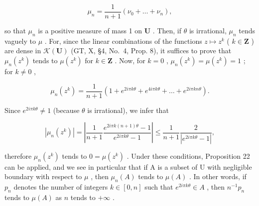 \[
\mu_ {n} = \frac {1}{n + 1} (\nu_ {0} + \dots + \nu_ {n}),
\]

so that \(\mu_n\) is a positive measure of mass 1 on \(\mathbf{U}\) . Then, if \(\theta\) is irrational, \(\mu_n\) tends vaguely to \(\mu\) . For, since the linear combinations of the functions \(z \mapsto z^k\) ( \(k \in \mathbf{Z}\) ) are dense in \(\mathcal{K}(\mathbf{U})\) (GT, X, §4, No.~4, Prop. 8), it suffices to prove that \(\mu_n(z^k)\) tends to \(\mu(z^k)\) for \(k \in \mathbf{Z}\) . Now, for \(k = 0\) , \(\mu_n(z^k) = \mu(z^k) = 1\) ; for \(k \neq 0\) ,

\[
\mu_ {n} (z ^ {k}) = \frac {1}{n + 1} (1 + e ^ {2 i \pi k \theta} + e ^ {4 i \pi k \theta} + \dots + e ^ {2 i \pi k n \theta}).
\]

Since \(e^{2i\pi k\theta} \neq 1\) (because \(\theta\) is irrational), we infer that

\[
\left| \mu_ {n} (z ^ {k}) \right| = \left| \frac {1}{n + 1} \frac {e ^ {2 i \pi k (n + 1) \theta} - 1}{e ^ {2 i \pi k \theta} - 1} \right| \leqslant \frac {1}{n + 1} \frac {2}{\left| e ^ {2 i \pi k \theta} - 1 \right|},
\]

therefore \(\mu_n(z^k)\) tends to \(0 = \mu (z^k)\) . Under these conditions, Proposition 22 can be applied, and we see in particular that if A is a subset of U with negligible boundary with respect to \(\mu\) , then \(\mu_n(A)\) tends to \(\mu(A)\) . In other words, if \(p_n\) denotes the number of integers \(k \in [0, n]\) such that \(e^{2i\pi k\theta} \in A\) , then \(n^{-1}p_n\) tends to \(\mu(A)\) as \(n\) tends to \(+\infty\) .

